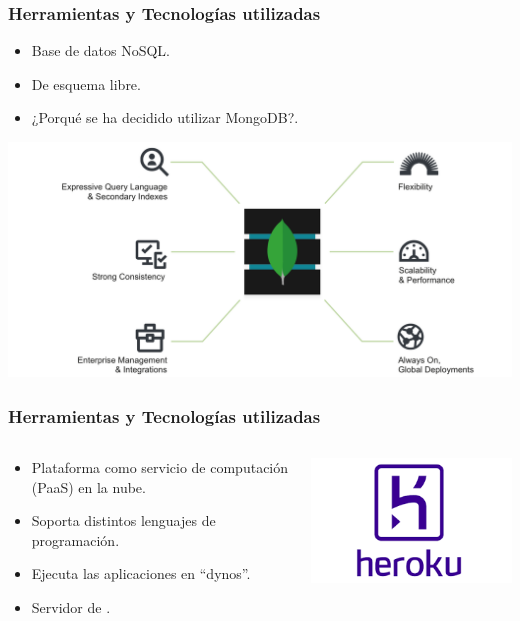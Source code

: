 \begin{frame}
	\frametitle{Herramientas y Tecnologías utilizadas}
			\begin{itemize}
				\item {Base de datos NoSQL}.
				\item {De esquema libre}.
				\item {¿Porqué se ha decidido utilizar MongoDB?}.
			\end{itemize}
		\endblock{}
		\vfill 
		\begin{center}
			\includegraphics[width=0.88\linewidth]{Images/mongodb-architecture}
		\end{center}
\end{frame}

\begin{frame}
	\frametitle{Herramientas y Tecnologías utilizadas}
	\begin{columns}
			\begin{column}{0.6\textwidth}
					\begin{itemize}
						\item {Plataforma como servicio de computación (PaaS) en la nube}.
						\item {Soporta distintos lenguajes de programación}.
						\item {Ejecuta las aplicaciones en ``dynos''.}
						\item {Servidor de \ULLAR{}}.
					\end{itemize}
				\endblock{}
			\end{column}
			\begin{column}{0.4\textwidth}
				\vfill 
					\begin{center}
						\includegraphics[width=0.9\linewidth]{Images/heroku}
					\end{center}
			\end{column}
	\end{columns}
\end{frame}

